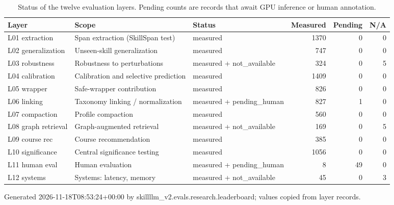 \begin{table}[H]
\centering
\small
\caption{Status of the twelve evaluation layers. Pending counts are records that await GPU inference or human annotation.}
\label{tab:evaluation-layer-status}
\begin{tabular}{llp{}rrr}
\toprule
Layer & Scope & Status & Measured & Pending & N/A \\
\midrule
L01 extraction & Span extraction (SkillSpan test) & measured & 1370 & 0 & 0 \\
L02 generalization & Unseen-skill generalization & measured & 747 & 0 & 0 \\
L03 robustness & Robustness to perturbations & measured + not\_available & 324 & 0 & 5 \\
L04 calibration & Calibration and selective prediction & measured & 1409 & 0 & 0 \\
L05 wrapper & Safe-wrapper contribution & measured & 826 & 0 & 0 \\
L06 linking & Taxonomy linking / normalization & measured + pending\_human & 827 & 1 & 0 \\
L07 compaction & Profile compaction & measured & 560 & 0 & 0 \\
L08 graph retrieval & Graph-augmented retrieval & measured + not\_available & 169 & 0 & 5 \\
L09 course rec & Course recommendation & measured & 385 & 0 & 0 \\
L10 significance & Central significance testing & measured & 1056 & 0 & 0 \\
L11 human eval & Human evaluation & measured + pending\_human & 8 & 49 & 0 \\
L12 systems & Systems: latency, memory & measured + not\_available & 45 & 0 & 3 \\
\bottomrule
\end{tabular}
\par\smallskip\footnotesize Generated 2026-11-18T08:53:24+00:00 by skillllm\_v2.evals.research.leaderboard; values copied from layer records.
\end{table}
